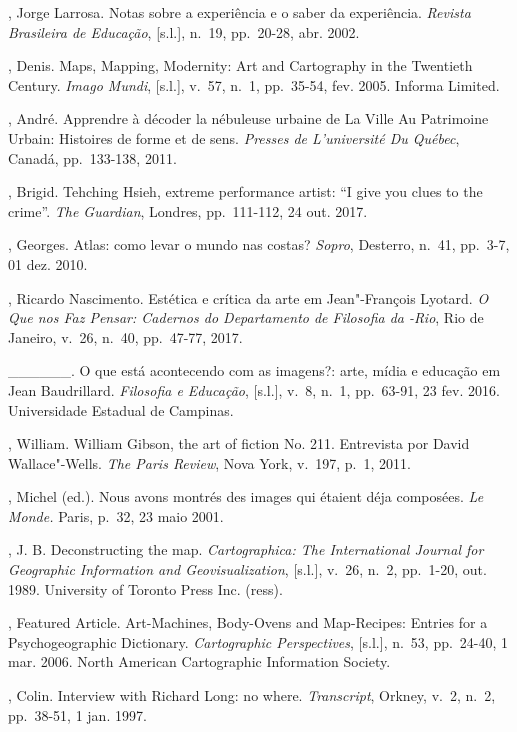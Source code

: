 \begin{Parskip}
, Jorge Larrosa. Notas sobre a experiência e o saber da
experiência. \emph{Revista Brasileira de Educação}, {[}s.l.{]}, n.~19,
pp.~20-28, abr. 2002.

, Denis. Maps, Mapping, Modernity: Art and Cartography in the
Twentieth Century. \emph{Imago Mundi}, {[}s.l.{]}, v.~57, n.~1,
pp.~35-54, fev. 2005. Informa  Limited.

, André. Apprendre à décoder la nébuleuse urbaine de La
Ville Au Patrimoine Urbain: Histoires de forme et de sens. \emph{Presses de
L'université Du Québec}, Canadá, pp.~133-138, 2011.

, Brigid. Tehching Hsieh, extreme performance artist: ``I give
you clues to the crime''. \emph{The Guardian}, Londres, pp.~111-112, 24
out. 2017.

, Georges. Atlas: como levar o mundo nas costas?
\emph{Sopro}, Desterro, n.~41, pp.~3-7, 01 dez. 2010. 

, Ricardo Nascimento. Estética e crítica da arte em
Jean"-François Lyotard. \emph{O Que nos Faz Pensar: Cadernos do
Departamento de Filosofia da -Rio}, Rio de Janeiro, v.~26, n.~40,
pp.~47-77, 2017.

\_\_\_\_\_\_. O que está acontecendo com as imagens?: arte, mídia e
educação em Jean Baudrillard. \emph{Filosofia e Educação}, {[}s.l.{]},
v.~8, n.~1, pp.~63-91, 23 fev. 2016. Universidade Estadual de Campinas.

, William. William Gibson, the art of fiction No. 211. Entrevista por David
Wallace"-Wells. \emph{The
Paris Review}, Nova York, v.~197, p.~1, 2011. 

, Michel (ed.). Nous avons montrés des images qui étaient déja
composées. \emph{Le Monde.} Paris, p.~32, 23 maio 2001.

, J. B. Deconstructing the map. \emph{Cartographica: The
International Journal for Geographic Information and Geovisualization},
{[}s.l.{]}, v.~26, n.~2, pp.~1-20, out. 1989. University of Toronto Press
Inc. (ress).

, Featured Article. Art-Machines, Body-Ovens and Map-Recipes:
Entries for a Psychogeographic Dictionary. \emph{Cartographic
Perspectives}, {[}s.l.{]}, n.~53, pp.~24-40, 1 mar. 2006. North American
Cartographic Information Society.

, Colin. Interview with Richard Long: no where.
\emph{Transcript}, Orkney, v.~2, n.~2, pp.~38-51, 1 jan. 1997.


\end{Parskip}
